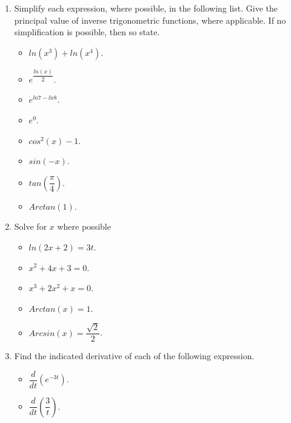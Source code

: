 \documentclass[fleqn]{article}
\begin{document}
  \begin{enumerate}
    \item Simplify each expression, where possible, in the following list. Give the
    principal value of inverse trigonometric functions, where applicable. If no
    simplification is possible, then so state.

    \begin{itemize}
      \item $ln (x^3)+ln (x^4)$.

      \item $e^{\dfrac{ln (x)}{2}}$.

      \item $e^{ln 7-ln 8}$.

      \item $e^0$.

      \item $cos^{2}(x)-1$.

      \item $sin(-x)$.

      \item $tan(\dfrac{\pi}{4})$.

      \item $Arctan(1)$.

    \end{itemize}


    \item Solve for $x$ where possible
    \begin{itemize}
      \item $ln(2x+2)=3t$.

      \item $x^2+4x+3=0$.

      \item $x^3+2x^2+x=0$.

      \item $Arctan (x)=1$.

      \item $Arcsin (x)=\dfrac{\sqrt{2}}{2}$.

    \end{itemize}

    \item Find the indicated derivative of each of the following expression.
    \begin{itemize}
      \item $\dfrac{d}{dt} \left(e^{-3t}\right)$.

      \item $\dfrac{d}{dt} \left(\dfrac{3}{t}\right)$.


\end{itemize}
\end{enumerate}
\end{document}
